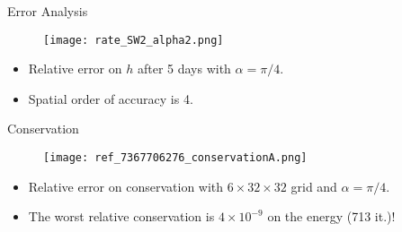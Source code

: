 \documentclass[11pt]{beamer}
\begin{document}

\begin{frame}{Error Analysis}
\begin{figure}
\texttt{[image: rate\_SW2\_alpha2.png]}
\end{figure}
\begin{itemize}
\item Relative error on $h$ after 5 days with $\alpha = \pi/4$.
\item Spatial order of accuracy is 4.
\end{itemize}
\end{frame}


\begin{frame}{Conservation}
\begin{figure}
\texttt{[image: ref\_7367706276\_conservationA.png]}
\end{figure}
\begin{itemize}
\item Relative error on conservation with $6 \times 32 \times 32$ grid and $\alpha=\pi/4$.
\item The worst relative conservation is $4 \times 10^{-9}$ on the energy (713 it.)!
\end{itemize}
\end{frame}


\end{document}
